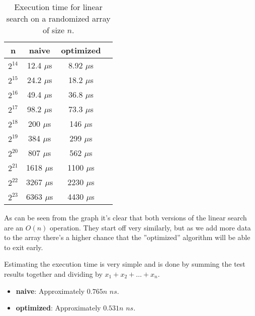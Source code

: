 \documentclass[a4paper,11pt]{article}
\begin{document}
\begin{table}[H]
\centering
\begin{tabular}{|c|c|c|c|}
\hline
\textbf{n} & \textbf{naive} & \textbf{optimized} \\
\hline
	$2^{14}$ & 12.4 $\mu$s & 8.92 $\mu$s \\
	$2^{15}$ & 24.2 $\mu$s & 18.2 $\mu$s \\
	$2^{16}$ & 49.4 $\mu$s & 36.8 $\mu$s \\
	$2^{17}$ & 98.2 $\mu$s & 73.3 $\mu$s \\
	$2^{18}$ & 200 $\mu$s & 146 $\mu$s \\
	$2^{19}$ & 384 $\mu$s & 299 $\mu$s \\
	$2^{20}$ & 807 $\mu$s & 562 $\mu$s \\
	$2^{21}$ & 1618 $\mu$s & 1100 $\mu$s \\
	$2^{22}$ & 3267 $\mu$s & 2230 $\mu$s \\
	$2^{23}$ & 6363 $\mu$s & 4430 $\mu$s \\
\hline
\end{tabular}
\caption{Execution time for linear search on a randomized array of size $n$.}
\label{tab:table1}
\end{table}

\begin{table}[H]
\centering
{}
\end{table}

As can be seen from the graph it's clear that both versions of the linear search are an $O(n)$ operation.
They start off very similarly, but as we add more data to the array there's a higher chance that the ''optimized'' algorithm will be able to exit early.

Estimating the execution time is very simple and is done by summing the test results together and dividing by $x_1 + x_2 + \dots + x_n$.

\begin{itemize}
\item \textbf{naive}: Approximately $0.765n$ $ns$.
\item \textbf{optimized}: Approximately $0.531n$ $ns$.
\end{itemize}
\end{document}
